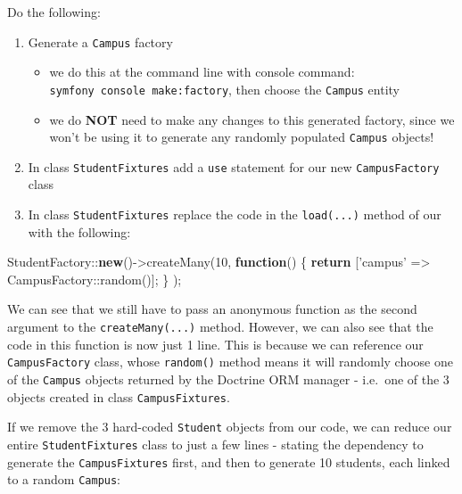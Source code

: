 \documentclass[a4paperpaper,openright]{book}
\newenvironment{Shaded}{}{}
\newcommand{\DecValTok}[1]{\textcolor[rgb]{0.25,0.63,0.44}{#1}}
\newcommand{\KeywordTok}[1]{\textcolor[rgb]{0.00,0.44,0.13}{\textbf{#1}}}
\newcommand{\NormalTok}[1]{#1}
\newcommand{\OtherTok}[1]{\textcolor[rgb]{0.00,0.44,0.13}{#1}}
\newcommand{\StringTok}[1]{\textcolor[rgb]{0.25,0.44,0.63}{#1}}
\providecommand{\tightlist}{%
  \setlength{\itemsep}{0pt}\setlength{\parskip}{0pt}}
\begin{document}
Do the following:

\begin{enumerate}
\def\labelenumi{\arabic{enumi}.}
\item
  Generate a \texttt{Campus} factory

  \begin{itemize}
  \tightlist
  \item
    we do this at the command line with console command:
    \texttt{symfony\ console\ make:factory}, then choose the
    \texttt{Campus} entity
  \item
    we do \textbf{NOT} need to make any changes to this generated
    factory, since we won't be using it to generate any randomly
    populated \texttt{Campus} objects!
  \end{itemize}
\item
  In class \texttt{StudentFixtures} add a \texttt{use} statement for our
  new \texttt{CampusFactory} class
\item
  In class \texttt{StudentFixtures} replace the code in the
  \texttt{load(...)} method of our with the following:
\end{enumerate}

\begin{Shaded}
\begin{Highlighting}[]
\NormalTok{    StudentFactory::}\KeywordTok{new}\OtherTok{()}\NormalTok{->createMany}\OtherTok{(}\DecValTok{10}\OtherTok{,}
        \KeywordTok{function}\OtherTok{()}\NormalTok{ \{}
            \KeywordTok{return} \OtherTok{[}\StringTok{'campus'}\NormalTok{ => CampusFactory::random}\OtherTok{()];}
\NormalTok{        \}}
    \OtherTok{);}
\end{Highlighting}
\end{Shaded}

We can see that we still have to pass an anonymous function as the
second argument to the \texttt{createMany(...)} method. However, we can
also see that the code in this function is now just 1 line. This is
because we can reference our \texttt{CampusFactory} class, whose
\texttt{random()} method means it will randomly choose one of the
\texttt{Campus} objects returned by the Doctrine ORM manager - i.e.~one
of the 3 objects created in class \texttt{CampusFixtures}.

If we remove the 3 hard-coded \texttt{Student} objects from our code, we
can reduce our entire \texttt{StudentFixtures} class to just a few lines
- stating the dependency to generate the \texttt{CampusFixtures} first,
and then to generate 10 students, each linked to a random
\texttt{Campus}:
\end{document}
